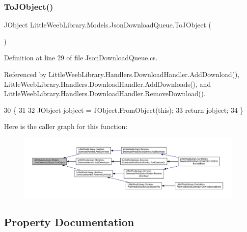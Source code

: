 \subsubsection{\texorpdfstring{To\+J\+Object()}{ToJObject()}}
{\footnotesize\ttfamily J\+Object Little\+Weeb\+Library.\+Models.\+Json\+Download\+Queue.\+To\+J\+Object (\begin{DoxyParamCaption}{ }\end{DoxyParamCaption})}



Definition at line 29 of file Json\+Download\+Queue.\+cs.



Referenced by Little\+Weeb\+Library.\+Handlers.\+Download\+Handler.\+Add\+Download(), Little\+Weeb\+Library.\+Handlers.\+Download\+Handler.\+Add\+Downloads(), and Little\+Weeb\+Library.\+Handlers.\+Download\+Handler.\+Remove\+Download().


\begin{DoxyCode}
30         \{
31 
32             JObject jobject = JObject.FromObject(\textcolor{keyword}{this});
33             \textcolor{keywordflow}{return} jobject;
34         \}
\end{DoxyCode}
Here is the caller graph for this function\+:\nopagebreak
\begin{figure}[H]
\begin{center}
\leavevmode
\includegraphics[width=350pt]{class_little_weeb_library_1_1_models_1_1_json_download_queue_a1d77053fc493aa88857bcafd6fea4bf7_icgraph}
\end{center}
\end{figure}


\subsection{Property Documentation}
\mbox{\label{class_little_weeb_library_1_1_models_1_1_json_download_queue_ae1c18d45b790f6d9eb3e7f80881a5717}} 
